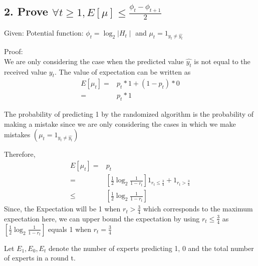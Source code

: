 \documentclass{article}
\begin{document}
\subsection*{2. Prove \( \forall t \geq 1, E[\mu] \le \frac{\phi_{t} - \phi_{t+1}}{2} \)}
\begin{description}
  \item{Given:} Potential function: \( \phi_{t} = \log_2{\mid H_{t} \mid} \) and \( \mu_{t} = 1_{y_{t} \neq \hat{y_{t}} } \)
  \item{Proof:} \\
    We are only considering the case when the predicted value \( \hat{y_{t}} \) is not equal to the received value \( y_{t} \).
    The value of expectation can be written as 
    \begin{align*}
      E[\mu_{t}] =& p_{t}*1 + (1 - p_{t})*0 \\
      =& p_{t}*1
    \end{align*}

    The probability of predicting 1 by the randomized algorithm is the probability of making a mistake since we are only considering the cases in which we make mistakes \(  ( \mu_{t} = 1_{y_{t} \neq \hat{y_{t}}})\)

    Therefore, 
    \begin{align*}
      E[\mu_{t}] =& p_{t}\\
      =& [\frac{1}{2} \log_2{\frac{1}{1 - r_{t}}} ] 1_{r_{t} \le \frac{3}{4}} + 1_{r_{t} > \frac{3}{4}} \\
      \le & [\frac{1}{2} \log_2{\frac{1}{1 - r_{t}}}]
    \end{align*}
    Since, the Expectation will be 1 when \( r_{t} > \frac{3}{4} \) which corresponds to the maximum expectation here, we can upper bound the expectation by using \( r_{t} \le \frac{3}{4} \) as \( [\frac{1}{2} \log_2{\frac{1}{1 - r_{t}}} ] \) equals 1 when \( r_{t} = \frac{3}{4} \)

    Let \( E_{1}, E_{0}, E_{t} \) denote the number of experts predicting 1, 0 and the total number of experts in a round t.


\end{description}
\end{document}
